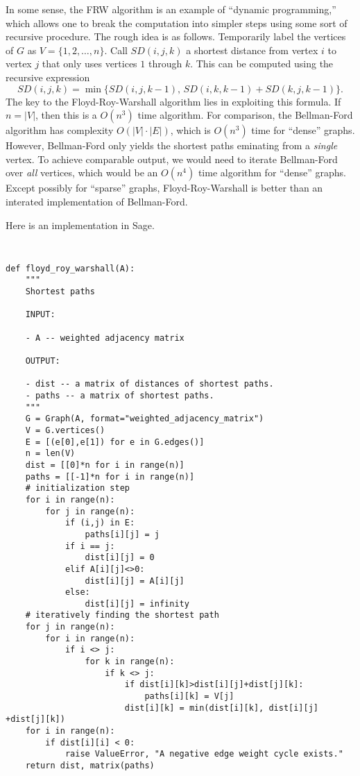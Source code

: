In some sense, the FRW algorithm is an example of
``dynamic programming,'' which allows one to break the computation
into simpler steps using some sort of recursive procedure. The rough
idea is as follows. Temporarily label the vertices of $G$ as
$V = \{1,2,\dots,n\}$. Call $SD(i,j,k)$ a shortest distance from
vertex $i$ to vertex $j$ that only uses vertices $1$ through $k$. This
can be computed using the recursive expression
\[
SD(i,j,k)
=
\min\{ SD(i,j,k-1),\, SD(i,k,k-1) + SD(k,j,k-1)\}.
\]
The key to the Floyd-Roy-Warshall algorithm lies in exploiting this
formula. If $n = |V|$, then this is a $O(n^3)$ time algorithm. For
comparison, the Bellman-Ford algorithm has complexity
$O(|V| \cdot |E|)$, which is $O(n^3)$ time for ``dense''
graphs. However, Bellman-Ford only yields the shortest paths eminating
from a \emph{single} vertex. To achieve comparable output, we would
need to iterate Bellman-Ford over \emph{all} vertices, which would be
an  $O(n^4)$ time algorithm for ``dense'' graphs. Except possibly for
``sparse'' graphs, Floyd-Roy-Warshall is better than an interated
implementation of Bellman-Ford.

Here is an implementation in Sage.
%
\begin{center}
\fontsize{9pt}{9pt}
\selectfont
\tt
\begin{lstlisting}
def floyd_roy_warshall(A):
    """
    Shortest paths

    INPUT:

    - A -- weighted adjacency matrix

    OUTPUT:

    - dist -- a matrix of distances of shortest paths.
    - paths -- a matrix of shortest paths.
    """
    G = Graph(A, format="weighted_adjacency_matrix")
    V = G.vertices()
    E = [(e[0],e[1]) for e in G.edges()]
    n = len(V)
    dist = [[0]*n for i in range(n)]
    paths = [[-1]*n for i in range(n)]
    # initialization step
    for i in range(n):
        for j in range(n):
            if (i,j) in E:
                paths[i][j] = j
            if i == j:
                dist[i][j] = 0
            elif A[i][j]<>0:
                dist[i][j] = A[i][j]
            else:
                dist[i][j] = infinity
    # iteratively finding the shortest path
    for j in range(n):
        for i in range(n):
            if i <> j:
                for k in range(n):
                    if k <> j:
                        if dist[i][k]>dist[i][j]+dist[j][k]:
                            paths[i][k] = V[j]
                        dist[i][k] = min(dist[i][k], dist[i][j] +dist[j][k])
    for i in range(n):
        if dist[i][i] < 0:
            raise ValueError, "A negative edge weight cycle exists."
    return dist, matrix(paths)
\end{lstlisting}
\end{center}

